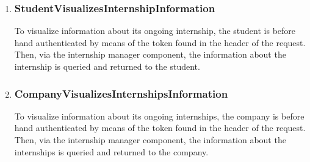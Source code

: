 \begin{enumerate}[label=\textbf{RV\arabic* -}]
\item \subsubsection{StudentVisualizesInternshipInformation}

To visualize information about its ongoing internship, the student is before hand authenticated by means of the token found in the header of the request.
Then, via the internship manager component, the information about the internship is queried and returned to the student.

\begin{figure}[H]
    \centering
\end{figure}

\item \subsubsection{CompanyVisualizesInternshipsInformation}

To visualize information about its ongoing internships, the company is before hand authenticated by means of the token found in the header of the request.
Then, via the internship manager component, the information about the internships is queried and returned to the company.

\begin{figure}[H]
    \centering
\end{figure}


\end{enumerate}
